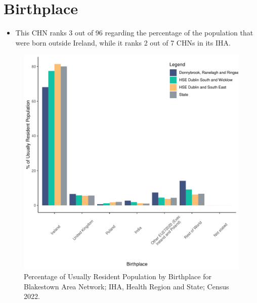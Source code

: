 \documentclass{article}
\begin{document}
\section{Birthplace}\label{sect:Birth}
\begin{itemize}
\item This CHN ranks  3 out of 96 regarding the percentage of the population that were born outside Ireland, while it ranks  2 out of 7 CHNs in its IHA.
\end{itemize}
\begin{figure}[H]
	\centering
	\includegraphics[width = 130mm]{../figures/BirthED.pdf}
	\caption{Percentage of Usually Resident Population by Birthplace for Blakestown Area Network; IHA, Health Region and State; Census 2022.}
	\label{fig:vbnv}
	\end{figure}
	
\end{document}
